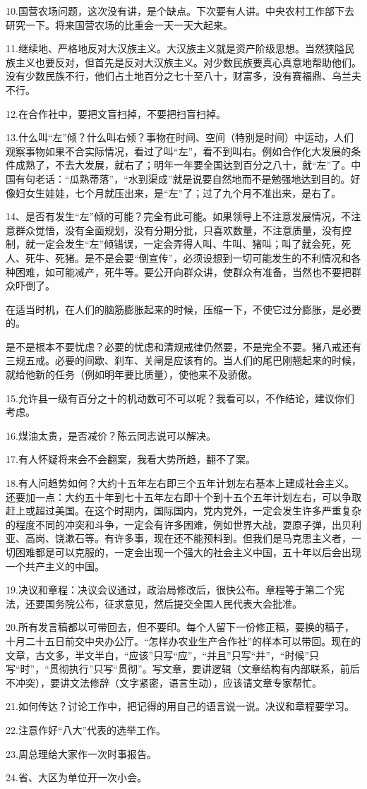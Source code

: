 10.国营农场问题，这次没有讲，是个缺点。下次要有人讲。中央农村工作部下去研究一下。将来国营农场的比重会一天一天大起来。

11.继续地、严格地反对大汉族主义。大汉族主义就是资产阶级思想。当然狭隘民族主义也要反对，但首先是反对大汉族主义。对少数民族要真心真意地帮助他们。没有少数民族不行，他们占土地百分之七十至八十，财富多，没有赛福鼎、乌兰夫不行。

12.在合作社中，要把文盲扫掉，不要把扫盲扫掉。

13.什么叫“左”倾？什么叫右倾？事物在时间、空间（特别是时间）中运动，人们观察事物如果不合实际情况，看过了叫“左”，看不到叫右。例如合作化大发展的条件成熟了，不去大发展，就右了；明年一年要全国达到百分之八十，就“左”了。中国有句老话：“瓜熟蒂落”，“水到渠成”就是说要自然地而不是勉强地达到目的。好像妇女生娃娃，七个月就压出来，是“左”了；过了九个月不准出来，是右了。

14、是否有发生“左”倾的可能？完全有此可能。如果领导上不注意发展情况，不注意群众觉悟，没有全面规划，没有分期分批，只喜欢数量，不注意质量，没有控制，就一定会发生“左”倾错误，一定会弄得人叫、牛叫、猪叫；叫了就会死，死人、死牛、死猪。是不是会要“倒宣传”，必须设想到一切可能发生的不利情况和各种困难，如可能减产，死牛等。要公开向群众讲，使群众有准备，当然也不要把群众吓倒了。

在适当时机，在人们的脑筋膨胀起来的时候，压缩一下，不使它过分膨胀，是必要的。

是不是根本不要忧虑？必要的忧虑和清规戒律仍然要，不是完全不要。猪八戒还有三规五戒。必要的间歇、刹车、关闸是应该有的。当人们的尾巴刚翘起来的时候，就给他新的任务（例如明年要比质量），使他来不及骄傲。

15.允许县一级有百分之十的机动数可不可以呢？我看可以，不作结论，建议你们考虑。

16.煤油太贵，是否减价？陈云同志说可以解决。

17.有人怀疑将来会不会翻案，我看大势所趋，翻不了案。

18.有人问趋势如何？大约十五年左右即三个五年计划左右基本上建成社会主义。还要加一点：大约五十年到七十五年左右即十个到十五个五年计划左右，可以争取赶上或超过美国。在这个时期内，国际国内，党内党外，一定会发生许多严重复杂的程度不同的冲突和斗争，一定会有许多困难，例如世界大战，耍原子弹，出贝利亚、高岗、饶漱石等。有许多事，现在还不能预料到。但我们是马克思主义者，一切困难都是可以克服的，一定会出现一个强大的社会主义中国，五十年以后会出现一个共产主义的中国。

19.决议和章程：决议会议通过，政治局修改后，很快公布。章程等于第二个宪法，还要国务院公布，征求意见，然后提交全国人民代表大会批准。

20.所有发言稿都以可带回去，但不要印。每个人留下一份修正稿，要换的稿子，十月二十五日前交中央办公厅。“怎样办农业生产合作社”的样本可以带回。现在的文章，古文多，半文半白，“应该”只写“应”，“并且”只写“并”，“时候”只写“时”，“贯彻执行”只写“贯彻”。写文章，要讲逻辑（文章结构有内部联系，前后不冲突），要讲文法修辞（文字紧密，语言生动），应该请文章专家帮忙。

21.如何传达？讨论工作中，把记得的用自己的语言说一说。决议和章程要学习。

22.注意作好“八大”代表的选举工作。

23.周总理给大家作一次时事报告。

24.省、大区为单位开一次小会。


